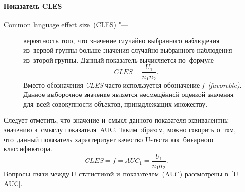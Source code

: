 \documentclass[]{scrreprt}
\begin{document}
\paragraph{Показатель CLES}
\begin{description}
		\item[Common language effect size~(CLES) "---] вероятность того, что~значение случайно выбранного наблюдения из~первой группы больше значения случайно выбранного наблюдения из~второй группы. Данный показатель вычисляется по~формуле
		\begin{equation}\label{eq:CLES}
		CLES = \frac{U_{1}}{n_{1}n_{2}}.
		\end{equation}
		Вместо обозначения \textit{CLES} часто используется обозначение \textit{f~(favorable)}. Данное выборочное значение является несмещённой оценкой значения для~всей совокупности объектов, принадлежащих множеству.
\end{description}
Следует отметить, что~значение и~смысл данного показателя эквивалентны значению и~смыслу показателя~\href{https://en.wikipedia.org/wiki/Receiver_operating_characteristic}{AUC}\cite{Wiki:ROC}. Таким образом, можно говорить о~том, что~данный показатель характеризует качество U-теста как~бинарного классификатора.
\begin{equation}\label{eq:AUC}
CLES = f = AUC_{1} = \frac{U_{1}}{n_{1}n_{2}}.
\end{equation}
Вопросы связи между U-статистикой и~показателем~(AUC) рассмотрены в~\ref{U-AUC}.
\end{document}
